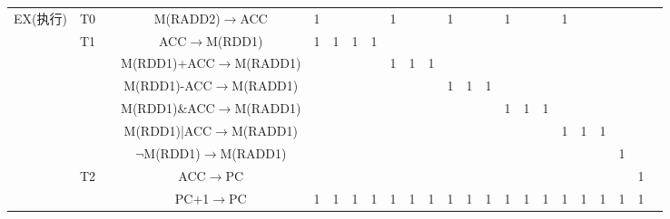 \documentclass[UTF8]{ctexrep}
\begin{document}
\begin{landscape}
\begin{center}
{\begin{tabular}{|c|c|c|c|c|c|c|c|c|c|c|c|c|c|c|c|c|c|c|c|c|c|c|}
\multirow{9}{*}{EX(执行)}  & T0                  &      & M(RADD2)$\to$ACC           & 1    &      &      &      & 1    &      &      & 1    &      &      & 1    &      &      & 1   &     &     &     &     &     \\ \cline{2-23} 
                         & \multirow{6}{*}{T1} &      & ACC$\to$M(RDD1)            & 1    & 1    & 1    & 1    &      &      &      &      &      &      &      &      &      &     &     &     &     &     &     \\ \cline{3-23} 
                         &                     &      & M(RDD1)+ACC$\to$M(RADD1)   &      &      &      &      & 1    & 1    & 1    &      &      &      &      &      &      &     &     &     &     &     &     \\ \cline{3-23} 
                         &                     &      & M(RDD1)-ACC$\to$M(RADD1)   &      &      &      &      &      &      &      & 1    & 1    & 1    &      &      &      &     &     &     &     &     &     \\ \cline{3-23} 
                         &                     &      & M(RDD1)\&ACC$\to$M(RADD1)  &      &      &      &      &      &      &      &      &      &      & 1    & 1    & 1    &     &     &     &     &     &     \\ \cline{3-23} 
                         &                     &      & M(RDD1)|ACC$\to$M(RADD1)   &      &      &      &      &      &      &      &      &      &      &      &      &      & 1   & 1   & 1   &     &     &     \\ \cline{3-23} 
                         &                     &      & $\neg$M(RDD1)$\to$M(RADD1) &      &      &      &      &      &      &      &      &      &      &      &      &      &     &     &     & 1   &     &     \\ \cline{2-23} 
                         & \multirow{2}{*}{T2} &      & ACC$\to$PC                 &      &      &      &      &      &      &      &      &      &      &      &      &      &     &     &     &     & 1   &     \\ \cline{3-23} 
                         &                     &      & PC+1$\to$PC                & 1    & 1    & 1    & 1    & 1    & 1    & 1    & 1    & 1    & 1    & 1    & 1    & 1    & 1   & 1   & 1   & 1   & 1   &     \\ \hline
\end{tabular}
}
\end{center}
\end{landscape}
\end{document}
